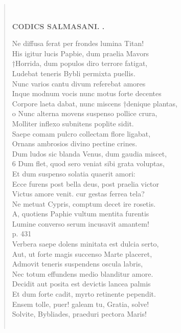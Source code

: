 \documentclass[11pt, a4paper]{report}
\begin{document}
\begin{verse}
        ﻿\pagebreak 
    \begin{center} \textbf{CODICS SALMASANI. .} \end{center} \marginpar{[205]} Ne diffusa ferat per frondes lumina Titan! \\ His igitur lucis Papbie, dum praelia Mavors \\ †Horrida, dum populos diro terrore fatigat, \\ Ludebat teneris Bybli permixta puellis. \\ Nunc varios cantu divum referebat amores \\ Inque modnum vocis nunc motus forte decentes \\ Corpore laeta dabat, nunc miscens †denique plantas, \\ o Nunc alterna movens suspenso pollice crura, \\ Molliter inflexo subnitens poplite sidit. \\ Saepe comam pulcro collectam flore ligabat, \\ Ornans ambrosios divino pectine crines. \\ Dum ludos sic blanda Venus, dum gaudia miscet, \\ 6 Dum flet, quod sero veniat sibi grata voluptas, \\ Et dum suspenso solatia quaerit amori: \\ Ecce furens post bella deus, post praelia victor \\ Victus amore venit. cur gestas ferrea tela? \\ Ne metuat Cypris, comptum decet ire rosetis. \\ A, quotiens Paphie vultum mentita furentis \\ Lumine converso serum incusavit amantem! \\ p. 431 \\ Verbera saepe dolens minitata est dulcia serto, \\ Aut, ut forte magis succenso Marte placeret, \\ Admovit teneris suspendens oscula labris, \\ Nec totum effundens medio blanditur amore. \\ Decidit aut posita est devictis lancea palmis \\ Et dum forte cadit, myrto retinente pependit. \\ Ensem tolle, puer! galeam tu, Gratia, solve! \\ Solvite, Bybliades, praeduri pectora Maris! \\ 
        ﻿\pagebreak 

\end{verse}
\end{document}

